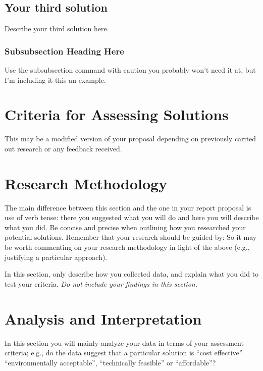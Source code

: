 \documentclass[peerreview]{IEEEtran} %
\begin{document}
\subsection{Your third solution}
Describe your third solution here.
\subsubsection{Subsubsection Heading Here}
Use the subsubsection command with caution you probably won't need it at, but I'm including it this an example.

\section{Criteria for Assessing Solutions} \label{sec:criteria}
This may be a modified version of your proposal depending on previously carried out research or any feedback received.  



\section{Research Methodology}
The main difference between this section and the one in your report proposal is use of verb tense: there you suggested what you will do and here you will describe what you did. Be concise and precise when outlining how you researched your potential solutions. 
Remember that your research should be guided by: 
So it may be worth commenting on your research methodology in light of the above (e.g., justifying a particular approach).  

In this section, only describe how you collected data, and explain what you did to test your criteria.  \emph{Do not include your findings in this section.}

\section{Analysis and Interpretation}
 In this section you will mainly analyze your data in terms of your assessment criteria; e.g., do the data suggest that a particular solution is ``cost effective'' ``environmentally acceptable'', ``technically feasible'' or ``affordable''?
   
\end{document}
